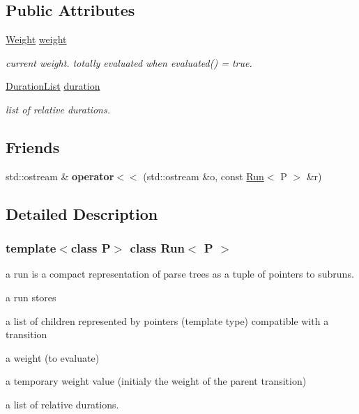 \subsection*{Public Attributes}
\begin{DoxyCompactItemize}
\item 
\mbox{\label{classRun_a61e6a26fe0ae42b0e4d54babc8c46684}} 
\mbox{\hyperlink{classWeight}{Weight}} \mbox{\hyperlink{classRun_a61e6a26fe0ae42b0e4d54babc8c46684}{weight}}
\begin{DoxyCompactList}\small\item\em current weight. totally evaluated when evaluated() = true. \end{DoxyCompactList}\item 
\mbox{\label{classRun_ad7eda2272d3a6be2ff0c3e2482051029}} 
\mbox{\hyperlink{classDurationList}{Duration\+List}} \mbox{\hyperlink{classRun_ad7eda2272d3a6be2ff0c3e2482051029}{duration}}
\begin{DoxyCompactList}\small\item\em list of relative durations. \end{DoxyCompactList}\end{DoxyCompactItemize}
\subsection*{Friends}
\begin{DoxyCompactItemize}
\item 
\mbox{\label{classRun_a03f68bada1f26f0771ac75ef3ec119cd}} 
std\+::ostream \& {\bfseries operator$<$$<$} (std\+::ostream \&o, const \mbox{\hyperlink{classRun}{Run}}$<$ P $>$ \&r)
\end{DoxyCompactItemize}


\subsection{Detailed Description}
\subsubsection*{template$<$class P$>$\newline
class Run$<$ P $>$}

a run is a compact representation of parse trees as a tuple of pointers to subruns. 

a run stores
\begin{DoxyItemize}
\item a list of children represented by pointers (template type) compatible with a transition
\item a weight (to evaluate)
\item a temporary weight value (initialy the weight of the parent transition)
\item a list of relative durations.
\end{DoxyItemize}


